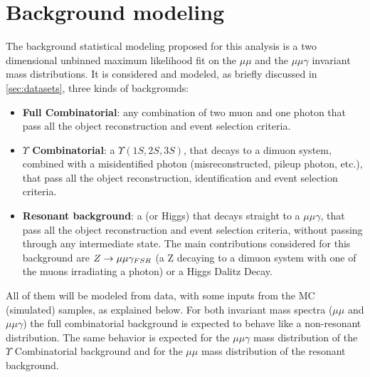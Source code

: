 \clearpage
\section{Background modeling} \label{sec:background_modeling}

The background statistical modeling proposed for this analysis is a two dimensional unbinned maximum likelihood fit on the $\mu\mu$ and the $\mu\mu\gamma$ invariant mass distributions. It is considered and modeled, as briefly discussed in \ref{sec:datasets}, three kinds of backgrounds:


\begin{itemize}
  \item \textbf{Full Combinatorial}: any combination of two muon and one photon that pass all the object reconstruction and event selection criteria.
  \item \textbf{$\Upsilon$ Combinatorial}: a $\Upsilon(1S,2S,3S)$, that decays to a dimuon system, combined with a misidentified photon (misreconstructed, pileup photon, etc.), that pass all the object reconstruction, identification and event selection criteria.
  \item \textbf{Resonant background}: a \Z (or Higgs) that decays straight to a $\mu\mu\gamma$, that pass all the object reconstruction and event selection criteria, without passing through any intermediate state. The main contributions considered for this background are $Z \rightarrow \mu\mu\gamma_{\small{FSR}}$ (a Z decaying to a dimuon system with one of the muons irradiating a photon) or a Higgs Dalitz Decay.
\end{itemize}

All of them will be modeled from data, with some inputs from the MC (simulated) samples, as explained below. For both invariant mass spectra ($\mu\mu$ and $\mu\mu\gamma$) the full combinatorial background is expected to behave like a non-resonant distribution. The same behavior is expected for the $\mu\mu\gamma$ mass distribution of the $\Upsilon$ Combinatorial background and for the $\mu\mu$ mass distribution of the resonant background. 


